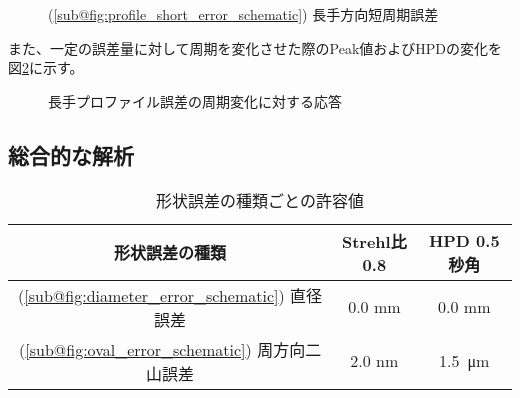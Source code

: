 \begin{figure}[!ht]
\centering
{}
\caption[]{(\ref{sub@fig:profile_short_error_schematic}) 長手方向短周期誤差}
\label{fig:meridional_short_allowed_error_analysis}
\end{figure}

また、一定の誤差量に対して周期を変化させた際のPeak値およびHPDの変化を図\ref{fig:meridional_period_variety}に示す。

\begin{figure}[!ht]
\centering
{}
\caption[]{長手プロファイル誤差の周期変化に対する応答}
\label{fig:meridional_period_variety}
\end{figure}


\subsection{総合的な解析}
\label{chap2_xray_error_response_summary}

\begin{table}[!ht]
\begin{center}
  \caption{形状誤差の種類ごとの許容値}
  \begin{tabular}{|c|c|c|} \hline
    形状誤差の種類 & Strehl比0.8 & HPD 0.5 秒角 \\ \hline
    (\ref{sub@fig:diameter_error_schematic}) 直径誤差 & 0.0 mm & 0.0 mm \\
    (\ref{sub@fig:oval_error_schematic}) 周方向二山誤差 & 2.0 nm & \SI{1.5}{\micro \metre} \\ \hline
  \end{tabular}
  \label{tb:xray_allowed_error}
\end{center}
\end{table}

\begin{comment}
また、これらに対応する集光面強度分布を示す。

\begin{figure}[!ht]
\centering
\subfloat[焦点面強度分布]{
    \texttt{[image: ideal/focus\_xray.png]}
    \label{fig:ideal_focus_xray}
}
\subfloat[焦点面強度プロファイル ($y=0$)]{
    \texttt{[image: ideal/focus\_profile\_xray.png]}
    \label{fig:ideal_focus_profile_xray}
}
\caption[]{硬X線 (4 keV)}
\label{fig:xray_just_allowed_focus}
\end{figure}
\end{comment}


